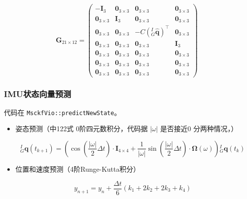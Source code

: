 \documentclass[12pt,a4paper]{article}
\begin{document}
\begin{equation*}
\mathbf{G}_{21 \times 12} = 
\begin{pmatrix}
-\mathbf{I}_3 & \mathbf{0}_{3\times 3} & \mathbf{0}_{3\times 3} & \mathbf{0}_{3\times 3} \\
\mathbf{0}_{3\times 3} & \mathbf{I}_3 &  \mathbf{0}_{3\times 3} & \mathbf{0}_{3\times 3} \\
\mathbf{0}_{3\times 3} & \mathbf{0}_{3\times 3} & -C\left({}^I_G\hat{\mathbf{q}}\right)^\top & \mathbf{0}_{3\times 3} \\
\mathbf{0}_{3\times 3} & \mathbf{0}_{3\times 3} & \mathbf{0}_{3\times 3} & \mathbf{I}_3 \\
\mathbf{0}_{3\times 3} & \mathbf{0}_{3\times 3} & \mathbf{0}_{3\times 3} & \mathbf{0}_{3\times 3} \\
\mathbf{0}_{3\times 3} & \mathbf{0}_{3\times 3} & \mathbf{0}_{3\times 3} & \mathbf{0}_{3\times 3} \\
\mathbf{0}_{3\times 3} & \mathbf{0}_{3\times 3} & \mathbf{0}_{3\times 3} & \mathbf{0}_{3\times 3}
\end{pmatrix}
\end{equation*}


\subsubsection{IMU状态向量预测}

代码在 \verb|MsckfVio::predictNewState|。

\begin{itemize}
\item 姿态预测（\cite{trawny2005indirect}中122式 0阶四元数积分，代码据 $|\omega|$ 是否接近0 分两种情况，{\color{red}{接近0 ??}}）

\begin{equation}
{}^I_G \mathbf{q}(t_{k+1}) =
\left(
\cos \left(\frac{|\omega|}{2} \Delta t\right) \cdot \mathbf{I}_{4 \times 4} +
\frac{1}{|\omega|} \sin \left(\frac{|\omega|}{2} \Delta t\right) \cdot 
\boldsymbol{\Omega}(\omega)
\right)
{}^I_G \mathbf{q}(t_k) 
\end{equation}

\item 位置和速度预测（4阶Runge-Kutta积分）

\begin{equation}
y_{n+1} = y_n + \frac{\Delta t}{6} (k_1 + 2k_2 + 2k_3 + k_4)
\end{equation}

\end{itemize}
\end{document}
